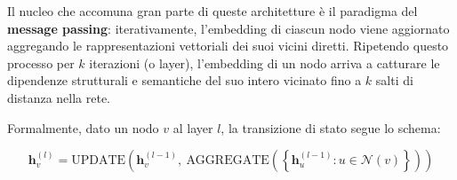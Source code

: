 Il nucleo che accomuna gran parte di queste architetture è il paradigma del \textbf{message passing}: iterativamente, l'embedding di ciascun nodo viene aggiornato aggregando le rappresentazioni vettoriali dei suoi vicini diretti. Ripetendo questo processo per $k$ iterazioni (o layer), l'embedding di un nodo arriva a catturare le dipendenze strutturali e semantiche del suo intero vicinato fino a $k$ salti di distanza nella rete.

Formalmente, dato un nodo $v$ al layer $l$, la transizione di stato segue lo schema:

\begin{equation}
\mathbf{h}_v^{(l)} = \text{UPDATE}\left(\mathbf{h}_v^{(l-1)},\ \text{AGGREGATE}\left(\left\{\mathbf{h}_u^{(l-1)} : u \in \mathcal{N}(v)\right\}\right)\right)
\label{eq:message_passing}
\end{equation}

